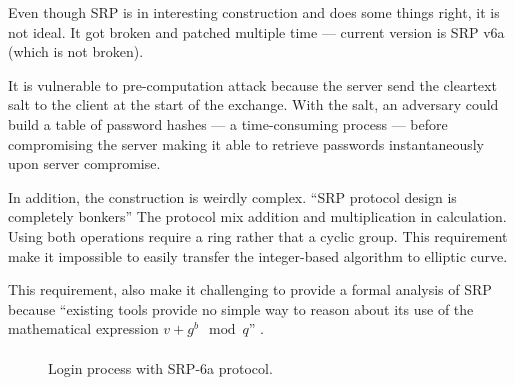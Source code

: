 \documentclass[../report.tex]{subfiles}
\begin{document}
Even though SRP is in interesting construction and does some things right, it is not ideal.
It got broken and patched multiple time --- current version is SRP v6a (which is not broken). %

It is vulnerable to pre-computation attack because the server send the cleartext salt to the client at the start of the exchange. With the salt, an adversary could build a table of password hashes --- a time-consuming process --- before compromising the server making it able to retrieve passwords instantaneously upon server compromise.

In addition, the construction is weirdly complex. ``SRP protocol design is completely bonkers''
The protocol mix addition and multiplication in calculation. Using both operations require a ring rather that a cyclic group. This requirement make it impossible to easily transfer the integer-based algorithm to elliptic curve. %

This requirement, also make it challenging to provide a formal analysis of SRP because 
``existing tools provide no simple way to reason about its use of the mathematical expression $v+g^b \mod{q}$'' \cite{SRP_Formal_Analysis}. %


\paragraph{}


\begin{figure}[h]
 \centering

 \setlength{\fboxsep}{10pt}
 \setlength{\fboxrule}{1pt}

 \caption{Login process with SRP-6a protocol.}
 \label{fig:SRP}
\end{figure}
\end{document}
